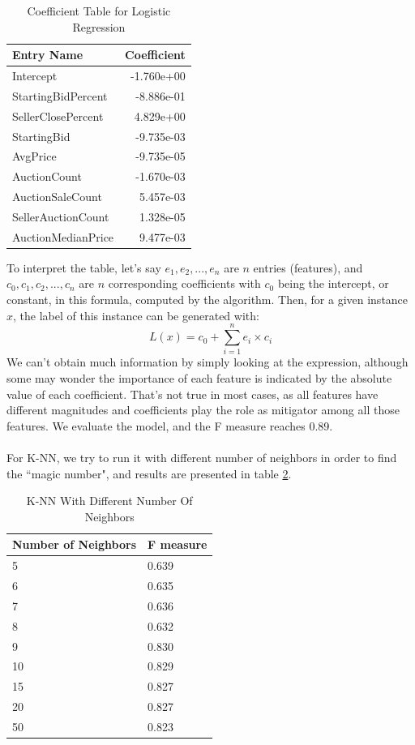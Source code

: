 \documentclass[CEJM,PDF]{cej} %
\begin{document}
\begin{table}[h]
\centering
\caption{Coefficient Table for Logistic Regression}
\label{r-lr}
\begin{tabular}{@{}|l|r|@{}}
\toprule
\hline
Entry Name  & Coefficient \\ \midrule
\hline
Intercept & -1.760e+00   \\
\hline
StartingBidPercent & -8.886e-01 \\
\hline
SellerClosePercent & 4.829e+00  \\
\hline
StartingBid & -9.735e-03  \\
\hline
AvgPrice & -9.735e-05 \\
\hline
AuctionCount & -1.670e-03   \\
\hline
AuctionSaleCount & 5.457e-03  \\
\hline
SellerAuctionCount & 1.328e-05   \\
\hline
AuctionMedianPrice & 9.477e-03  \\ \bottomrule
\hline
\end{tabular}
\end{table}

To interpret the table, let's say $e_1, e_2, ..., e_n$ are $n$ entries (features), and $c_0, c_1, c_2, ..., c_n$ are $n$ corresponding coefficients with $c_0$ being the intercept, or constant, in this formula, computed by the algorithm. Then, for a given instance $x$, the label of this instance can be generated with:
$$L(x) = c_0 + \sum_{i=1}^{n}e_i\times c_i$$
We can't obtain much information by simply looking at the expression, although some may wonder the importance of each feature is indicated by the absolute value of each coefficient. That's not true in most cases, as all features have different magnitudes and coefficients play the role as mitigator among all those features. We evaluate the model, and the F measure reaches 0.89.\\
\\
For K-NN, we try to run it with different number of neighbors in order to find the ``magic number", and results are presented in table \ref{r-knn}.

\begin{table}[h]
\centering
\caption{K-NN With Different Number Of Neighbors}
\label{r-knn}
\begin{tabular}{@{}|l|l|@{}}
\toprule
\hline
Number of Neighbors  & F measure \\ \midrule
\hline
5 & 0.639   \\
\hline
6 & 0.635   \\
\hline
7  & 0.636  \\
\hline
8 & 0.632  \\
\hline
9  & 0.830  \\ 
\hline
10 & 0.829 \\ 
\hline
15 & 0.827 \\ 
\hline
20 & 0.827 \\
\hline
50 & 0.823 \\ \bottomrule
\hline
\end{tabular}
\end{table}
\end{document}
